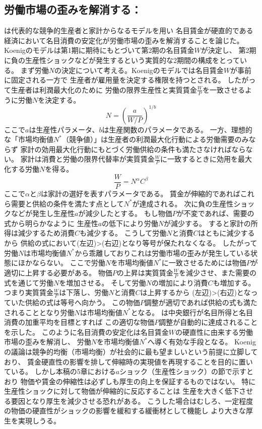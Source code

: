 \subsection{労働市場の歪みを解消する：\textcite{Koenig1995}}
\label{sec:chapter2_review_koenig_1995}
\textcite{Koenig1995}は代表的な競争的生産者と家計からなるモデルを用い
名目賃金が硬直的である経済において名目消費の安定化が労働市場の歪みを解消することを論じた。
Koenigのモデルは第1期に期待にもとづいて第2期の名目賃金\(W\)が決定し、
第2期に負の生産性ショックなどが発生するという実質的な2期間の構成をとっている。
まず労働\(N\)の決定について考える。Koenigのモデルでは名目賃金\(W\)が事前に固定される一方で
生産者が雇用量を決定する権限を持つとされる。
したがって生産者は利潤最大化のために
労働の限界生産性と実質賃金\(\frac{W}{P}\)を一致させるように労働\(N\)を決定する。
\[N=\left(\frac{a}{W/P}\right)^{1/b}\]
ここで\(a\)は生産性パラメータ、\(b\)は生産関数のパラメータである。
一方、理想的な「市場均衡値\(N^*\)（競争値）」は生産者の利潤最大化行動による労働需要のみならず
家計の効用最大化行動にもとづく労働供給の条件も満たさなければならない。
家計は消費と労働の限界代替率が実質賃金\(\frac{W}{P}\)に一致するときに効用を最大化する労働\(N\)を得る。
\[\frac{W}{P}=N^\alpha C^\beta\]
ここで\(\alpha\)と\(\beta\)は家計の選好を表すパラメータである。
賃金が伸縮的であればこれら需要と供給の条件を満たす点として\(N^*\)が達成される。
次に負の生産性ショックなどが発生し生産性\(a\)が減少したとする。
もし物価\(P\)が不変であれば、需要の式から明らかなように
生産性\(a\)の低下により労働\(N\)が減少する。
すると家計の所得は減少するため消費\(C\)も減少する。
こうして労働\(N\)と消費\(C\)はともに減少するから
供給の式において(左辺)>(右辺)となり等号が保たれなくなる。
したがって労働\(N\)は市場均衡値\(N^*\)から乖離しておりこれは労働市場の歪みが発生している状態にほかならない。
ここで労働\(N\)を市場均衡値\(N^*\)に一致させるためには物価\(P\)が適切に上昇する必要がある。
物価\(P\)の上昇は実質賃金\(\frac{W}{P}\)を減少させ、また需要の式を通じて労働\(N\)を増加させる。
そして労働\(N\)の増加により消費\(C\)も増加する。
つまり実質賃金\(\frac{W}{P}\)は下落し、労働\(N\)と消費\(C\)は上昇するから
(左辺)>(右辺)となっていた供給の式は等号へ向かう。
この物価\(P\)調整が適切であれば供給の式も満たされることとなり労働\(N\)は市場均衡値\(N^*\)となる。
\textcite{Koenig1995}は中央銀行が名目所得と名目消費の加重平均を目標とすれば
この適切な物価\(P\)調整が自動的に達成されることを示した。
このように名目消費の安定化は名目賃金\(W\)の硬直性に由来する労働市場の歪みを解消し、
労働\(N\)を市場均衡値\(N^*\)へ導く有効な手段となる。
Koenigの議論は競争的均衡（市場均衡）が社会的に最も望ましいという前提に立脚しており、
賃金硬直性の影響を排して伸縮時の実現値を再現することを目的に置いている。
しかし本稿の5章における\(a\)ショック（生産性ショック）の節で示すとおり
物価や賃金の伸縮性は必ずしも厚生の向上を保証するものではない。
特に生産性ショックに対して物価が伸縮的に反応することは
生産を大きく低下させる要因となり厚生を減少させる恐れがある。
こうした場合はむしろ、一定程度の物価の硬直性がショックの影響を緩和する緩衝材として機能し
より大きな厚生を実現しうる。

